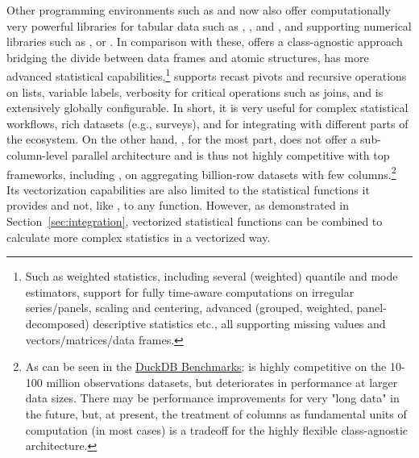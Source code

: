 \documentclass[nojss]{jss} %
\begin{document}
Other programming environments such as  and  now also offer computationally very powerful libraries for tabular data such as  \citep{jldataframes},  \citep{pypolars}, and  \citep{mckinney2010pandas, pypandas}, and supporting numerical libraries such as  \citep{pynumpy}, or  \citep{jlstatsbase}. %
In comparison with these,  offers a class-agnostic approach bridging the divide between data frames and atomic structures, has more advanced statistical capabilities,\footnote{Such as weighted statistics, including several (weighted) quantile and mode estimators, support for fully time-aware computations on irregular series/panels, scaling and centering, advanced (grouped, weighted, panel-decomposed) descriptive statistics etc., all supporting missing values and vectors/matrices/data frames.} supports recast pivots and recursive operations on lists, variable labels, verbosity for critical operations such as joins, and is extensively globally configurable. In short, it is very useful for complex statistical workflows, rich datasets (e.g., surveys), and for integrating with different parts of the  ecosystem. On the other hand, , for the most part, does not offer a sub-column-level parallel architecture and is thus not highly competitive with top frameworks, including , on aggregating billion-row datasets with few columns.\footnote{As can be seen in the \href{https://duckdblabs.github.io/db-benchmark/}{DuckDB Benchmarks}:  is highly competitive on the 10-100 million observations datasets, but deteriorates in performance at larger data sizes. There may be performance improvements for very "long data" in the future, but, at present, the treatment of columns as fundamental units of computation (in most cases) is a tradeoff for the highly flexible class-agnostic architecture.} Its vectorization capabilities are also limited to the statistical functions it provides and not, like , to any  function. However, as demonstrated in Section~\ref{sec:integration}, vectorized statistical functions can be combined to calculate more complex statistics in a vectorized way. \newline
\end{document}
